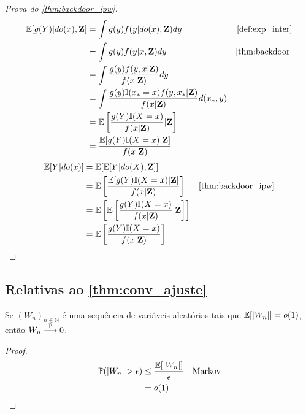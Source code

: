 \begin{proof}[Prova do \cref{thm:backdoor_ipw}]
 \begin{align*}
  \E[g(Y)|do(x),\Z]
  &= \int g(y) f(y|do(x),\Z) dy
  & \text{\cref{def:exp_inter}} \\
  &= \int g(y) f(y|x,\Z) dy
  & \text{\cref{thm:backdoor}} \\
  &= \int \frac{g(y) f(y,x|\Z)}{f(x|\Z)} dy \\
  &= \int \frac{g(y) \I(x_* = x) f(y,x_*|\Z)}{f(x|\Z)} d(x_*, y) \\
  &= \E\left[\frac{g(Y)\I(X=x)}{f(x|\Z)}|\Z\right] \\
  &= \frac{\E[g(Y)\I(X=x)|\Z]}{f(x|\Z)}
 \end{align*}
 \begin{align*}
  \E[Y|do(x)]
  &= \E[\E[Y|do(X),\Z]] \\
  &= \E\left[\frac{\E[g(Y)\I(X=x)|\Z]}{f(x|\Z)}\right] 
  & \text{\cref{thm:backdoor_ipw}} \\
  &= \E\left[\E\left[\frac{g(Y)\I(X=x)}{f(x|\Z)}|\Z\right]\right] \\
  &= \E\left[\frac{g(Y)\I(X=x)}{f(x|\Z)}\right]
 \end{align*}
\end{proof}

\subsection{Relativas ao \cref{thm:conv_ajuste}}

\begin{lemma}
 \label{lemma:conv_l1_to_p}
 Se $(W_n)_{n \in \mathbb{N}}$ é uma sequência de
 variáveis aleatórias tais que ${\mathbb E}[|W_n|] = o(1)$,
 então $W_n \stackrel{{\mathbb P}}{\longrightarrow} 0$.
\end{lemma}

\begin{proof}
 \begin{align*}
  {\mathbb P}(|W_n| > \epsilon)
  &\leq \frac{{\mathbb E}[|W_n|]}{\epsilon} & \text{Markov} \\
  &= o(1)
 \end{align*}
\end{proof}

